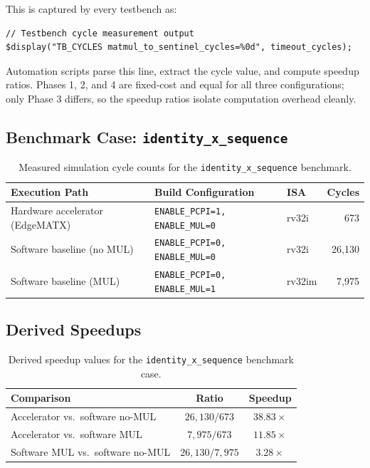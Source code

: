 ﻿\documentclass[12pt,a4paper]{report}
\renewcommand{\arraystretch}{1.2}
\begin{document}
This is captured by every testbench as:

\begin{lstlisting}[language={}]
// Testbench cycle measurement output
$display("TB_CYCLES matmul_to_sentinel_cycles=%0d", timeout_cycles);
\end{lstlisting}

Automation scripts parse this line, extract the cycle value, and compute speedup ratios.
Phases 1, 2, and 4 are fixed-cost and equal for all three configurations;
only Phase 3 differs, so the speedup ratios isolate computation overhead cleanly.

\subsection{Benchmark Case: \texttt{identity\_x\_sequence}}

\begin{table}[H]
\centering
\caption{Measured simulation cycle counts for the \texttt{identity\_x\_sequence} benchmark.}
\label{tab:cycle_comparison}
\small
\setlength{\tabcolsep}{5pt}
\renewcommand{\arraystretch}{1.4}
\begin{tabular}{p{}p{}p{}r}
\toprule
\textbf{Execution Path} & \textbf{Build Configuration} & \textbf{ISA} & \textbf{Cycles} \\
\midrule
Hardware accelerator (EdgeMATX)  & \texttt{ENABLE\_PCPI=1, ENABLE\_MUL=0} & rv32i  &    673 \\
Software baseline (no MUL)  & \texttt{ENABLE\_PCPI=0, ENABLE\_MUL=0} & rv32i  & 26{,}130 \\
Software baseline (MUL)     & \texttt{ENABLE\_PCPI=0, ENABLE\_MUL=1} & rv32im &  7{,}975 \\
\bottomrule
\end{tabular}
\end{table}

\subsection{Derived Speedups}

\begin{table}[H]
\centering
\caption{Derived speedup values for the \texttt{identity\_x\_sequence} benchmark case.}
\label{tab:speedups_identity}
\small
\setlength{\tabcolsep}{10pt}
\renewcommand{\arraystretch}{1.4}
\begin{tabular}{lcc}
\toprule
\textbf{Comparison} & \textbf{Ratio} & \textbf{Speedup} \\
\midrule
Accelerator vs.\ software no-MUL   & $26{,}130 / 673$ & $\mathbf{38.83\times}$ \\
Accelerator vs.\ software MUL      & $7{,}975  / 673$ & $\mathbf{11.85\times}$ \\
Software MUL vs.\ software no-MUL  & $26{,}130 / 7{,}975$ & $3.28\times$ \\
\bottomrule
\end{tabular}
\end{table}
\end{document}

